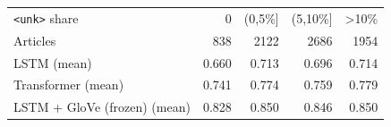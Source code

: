 \begin{tabular}{lrrrr}
\toprule
\texttt{<unk>} share & 0 & (0,5\%] & (5,10\%] & >10\% \\
Articles & 838 & 2122 & 2686 & 1954 \\ \midrule
LSTM (mean) & 0.660 & 0.713 & 0.696 & 0.714 \\
Transformer (mean) & 0.741 & 0.774 & 0.759 & 0.779 \\
LSTM + GloVe (frozen) (mean) & 0.828 & 0.850 & 0.846 & 0.850 \\
\bottomrule
\end{tabular}
